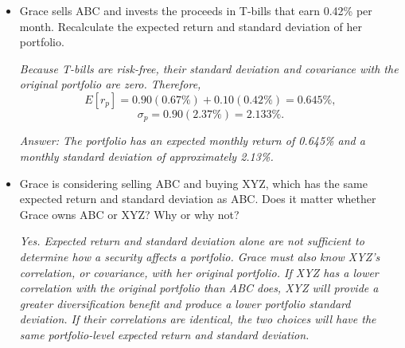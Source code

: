 \documentclass[11pt]{article}
\theoremstyle{definition}
\begin{document}
\begin{shaded}
\begin{enumerate}
\begin{itemize}
                \item Grace sells ABC and invests the proceeds in T-bills that earn
                0.42\% per month. Recalculate the expected return and standard
                deviation of her portfolio.
            
                \textit{Because T-bills are risk-free, their standard deviation and
                covariance with the original portfolio are zero. Therefore,}
                \[
                    E[r_p]
                    =0.90(0.67\%)+0.10(0.42\%)
                    =0.645\%,
                \]
                \[
                    \sigma_p
                    =0.90(2.37\%)
                    =2.133\%.
                \]
            
                \textit{Answer: The portfolio has an expected monthly return of
                0.645\% and a monthly standard deviation of approximately 2.13\%.}
            
                \item Grace is considering selling ABC and buying XYZ, which has the
                same expected return and standard deviation as ABC. Does it matter
                whether Grace owns ABC or XYZ? Why or why not?
            
                \textit{Yes. Expected return and standard deviation alone are not
                sufficient to determine how a security affects a portfolio. Grace
                must also know XYZ's correlation, or covariance, with her original
                portfolio. If XYZ has a lower correlation with the original
                portfolio than ABC does, XYZ will provide a greater diversification
                benefit and produce a lower portfolio standard deviation. If their
                correlations are identical, the two choices will have the same
                portfolio-level expected return and standard deviation.}
            
            \end{itemize}
    \end{enumerate}

    \end{shaded}
\end{document}
